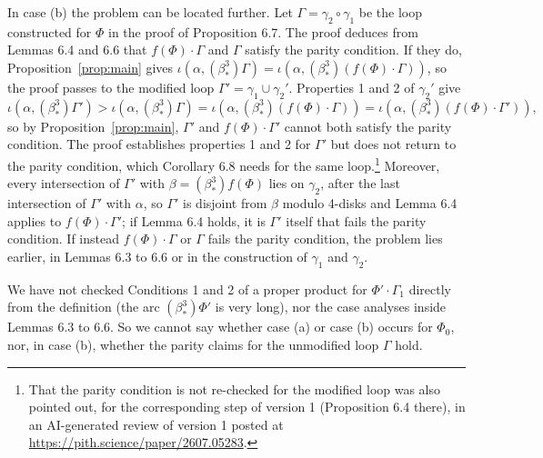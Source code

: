 \documentclass[11pt]{amsart}
\theoremstyle{remark}
\newcommand{\bs}{\beta^3_*}
\begin{document}
In case (b) the problem can be located further. Let $\Gamma=\gamma_2\circ\gamma_1$ be the loop constructed for $\Phi$ in the proof of Proposition 6.7. The proof deduces from Lemmas 6.4 and 6.6 that $f(\Phi)\cdot\Gamma$ and $\Gamma$ satisfy the parity condition. If they do, Proposition~\ref{prop:main} gives $\iota(\alpha,(\bs)\Gamma)=\iota(\alpha,(\bs)(f(\Phi)\cdot\Gamma))$, so the proof passes to the modified loop $\Gamma'=\gamma_1\cup\gamma_2'$. Properties 1 and 2 of $\gamma_2'$ give
\[
\iota(\alpha,(\bs)\Gamma')>\iota(\alpha,(\bs)\Gamma)=\iota(\alpha,(\bs)(f(\Phi)\cdot\Gamma))=\iota(\alpha,(\bs)(f(\Phi)\cdot\Gamma')),
\]
so by Proposition~\ref{prop:main}, $\Gamma'$ and $f(\Phi)\cdot\Gamma'$ cannot both satisfy the parity condition. The proof establishes properties 1 and 2 for $\Gamma'$ but does not return to the parity condition, which Corollary 6.8 needs for the same loop.\footnote{That the parity condition is not re-checked for the modified loop was also pointed out, for the corresponding step of version 1 (Proposition 6.4 there), in an AI-generated review of version 1 posted at \url{https://pith.science/paper/2607.05283}.} Moreover, every intersection of $\Gamma'$ with $\beta=(\bs)f(\Phi)$ lies on $\gamma_2$, after the last intersection of $\Gamma'$ with $\alpha$, so $\Gamma'$ is disjoint from $\beta$ modulo 4-disks and Lemma 6.4 applies to $f(\Phi)\cdot\Gamma'$; if Lemma 6.4 holds, it is $\Gamma'$ itself that fails the parity condition. If instead $f(\Phi)\cdot\Gamma$ or $\Gamma$ fails the parity condition, the problem lies earlier, in Lemmas 6.3 to 6.6 or in the construction of $\gamma_1$ and $\gamma_2$.

We have not checked Conditions 1 and 2 of a proper product for $\Phi'\cdot\Gamma_1$ directly from the definition (the arc $(\bs)\Phi'$ is very long), nor the case analyses inside Lemmas 6.3 to 6.6. So we cannot say whether case (a) or case (b) occurs for $\Phi_0$, nor, in case (b), whether the parity claims for the unmodified loop $\Gamma$ hold.
\end{document}
